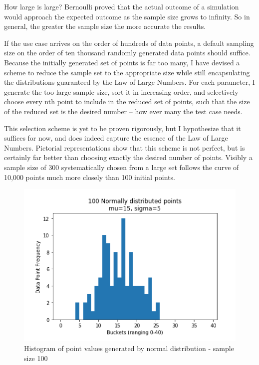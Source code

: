 How large is large? Bernoulli proved that the actual outcome of a simulation would approach the expected outcome as the sample size grows to infinity. So in general, the greater the sample size the more accurate the results.

If the use case arrives on the order of hundreds of data points, a default sampling size on the order of ten thousand randomly generated data points should suffice. Because the initially generated set of points is far too many, I have devised a scheme to reduce the sample set to the appropriate size while still encapsulating the distributions guaranteed by the Law of Large Numbers. For each parameter, I generate the too-large sample size, sort it in increasing order, and selectively choose every nth point to include in the reduced set of points, such that the size of the reduced set is the desired number – how ever many the test case needs.

This selection scheme is yet to be proven rigorously, but I hypothesize that it suffices for now, and does indeed capture the essence of the Law of Large Numbers. Pictorial representations show that this scheme is not perfect, but is certainly far better than choosing exactly the desired number of points. Visibly a sample size of 300 systematically chosen from a large set follows the curve of 10,000 points much more closely than 100 initial points.

\begin{figure}[h!]
\centering
\includegraphics[scale=0.7]{law1.png}
\caption{Histogram of point values generated by normal distribution - sample size 100}
\label{fig:law1}
\end{figure}


